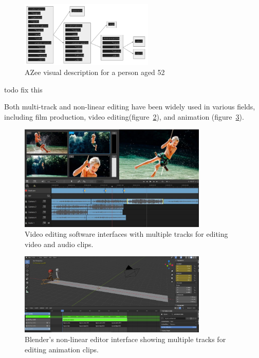 \documentclass[../../main.tex]{subfiles}
\begin{document}
\begin{figure}[h]
  \centering \includegraphics[width = 2.5in]{chapters/background_work/images/azee_score_example.png}
  \caption{AZee visual description for a person aged 52}
  \label{fig:azee_score_example}
\end{figure}


todo fix this


Both multi-track and non-linear editing have been widely used in various fields, including film production, video editing(figure~\ref{fig:video_edit}), and animation (figure~\ref{fig:nle_blender}). 

\begin{figure}[h]
    \centering
    \includegraphics[width=0.8\textwidth]{chapters/multi_track/images/video_editing.png}
    \caption{Video editing software interfaces with multiple tracks for editing video and audio clips.}
    \label{fig:video_edit}
\end{figure}

\begin{figure}[h]
    \centering
    \includegraphics[width=0.8\textwidth]{chapters/multi_track/images/nle_blender.png}
    \caption{Blender's non-linear editor interface showing multiple tracks for editing animation clips.}
    \label{fig:nle_blender}
\end{figure}
\end{document}
